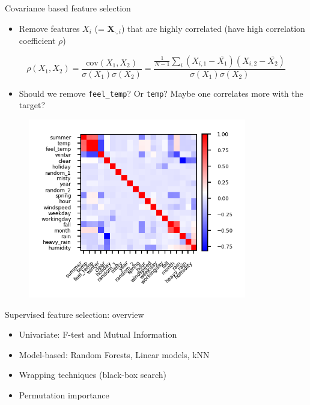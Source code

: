 \begin{frame}[allowframebreaks]{Covariance based feature selection}
\begin{itemize}
    \item Remove features $X_i$ (= $\mathbf{X}_{\cdot,i}$) that are highly correlated (have high correlation coefficient $\rho$)
\end{itemize}

\[
\rho(X_1, X_2) = \frac{\text{cov}(X_1, X_2)}{\sigma(X_1)\sigma(X_2)} = 
\frac{\frac{1}{N-1} \sum_i (X_{i,1} - \overline{X_1})(X_{i,2} - \overline{X_2})}
{\sigma(X_1)\sigma(X_2)}
\]

\begin{itemize}
    \item Should we remove \texttt{feel\_temp}? Or \texttt{temp}? Maybe one correlates more with the target?
\end{itemize}

\begin{figure}
    \centering
    \includegraphics[width=0.85\textwidth,keepaspectratio]{images/pre-processing/covariance-based.png}
\end{figure}
\end{frame}

\begin{frame}{Supervised feature selection: overview}
\begin{itemize}
    \item Univariate: F-test and Mutual Information
    \item Model-based: Random Forests, Linear models, kNN
    \item Wrapping techniques (black-box search)
    \item Permutation importance
\end{itemize}
\end{frame}


